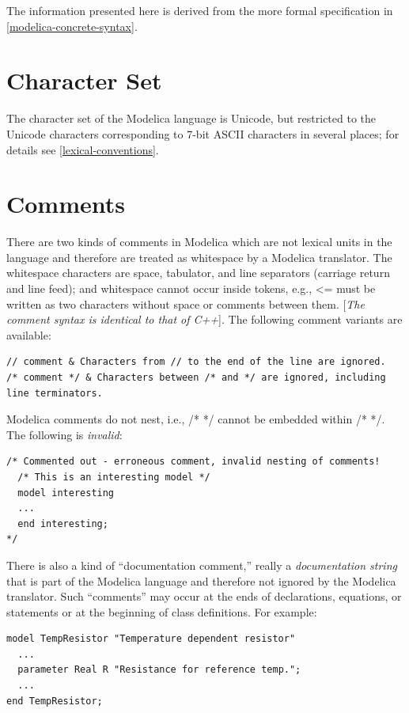 \documentclass[10pt,a4paper]{report}
\def\doublelabel#1{\label{#1}}
\begin{document}
The information presented here is derived from the more formal
specification in \ref{modelica-concrete-syntax}.

\section{Character Set}\doublelabel{character-set}

The character set of the Modelica language is Unicode, but restricted to
the Unicode characters corresponding to 7-bit ASCII characters in
several places; for details see \ref{lexical-conventions}.

\section{Comments}\doublelabel{comments}

There are two kinds of comments in Modelica which are not lexical units
in the language and therefore are treated as whitespace by a Modelica
translator. The whitespace characters are space, tabulator, and line
separators (carriage return and line feed); and whitespace cannot occur
inside tokens, e.g., \textless{}= must be written as two characters
without space or comments between them. {[}\emph{The comment syntax is
identical to that of C++}{]}. The following comment variants are
available:

\begin{lstlisting}[language=modelica]
// comment & Characters from // to the end of the line are ignored.
/* comment */ & Characters between /* and */ are ignored, including line terminators.
\end{lstlisting}

Modelica comments do not nest, i.e., /* */ cannot be embedded within /*
*/. The following is \emph{invalid}:
\begin{lstlisting}[language=modelica]
/* Commented out - erroneous comment, invalid nesting of comments!
  /* This is an interesting model */
  model interesting
  ...
  end interesting;
*/
\end{lstlisting}

There is also a kind of ``documentation comment,'' really a
\emph{documentation string} that is part of the Modelica language and
therefore not ignored by the Modelica translator. Such ``comments'' may
occur at the ends of declarations, equations, or statements or at the
beginning of class definitions. For example:

\begin{lstlisting}[language=modelica]
model TempResistor "Temperature dependent resistor"
  ...
  parameter Real R "Resistance for reference temp.";
  ...
end TempResistor;
\end{lstlisting}
\end{document}
